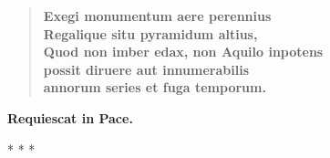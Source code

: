 \begin{quotex}
\begin{verse}
\textbf{Exegi monumentum aere perennius}\\

\textbf{Regalique situ pyramidum altius,}\\

\textbf{Quod non imber edax, non Aquilo inpotens}\\

\textbf{possit diruere aut innumerabilis}\\

\textbf{annorum series et fuga temporum.}\\
\end{verse}
\end{quotex}


\textbf{Requiescat in Pace.}




\begin{center}* * *\end{center}

